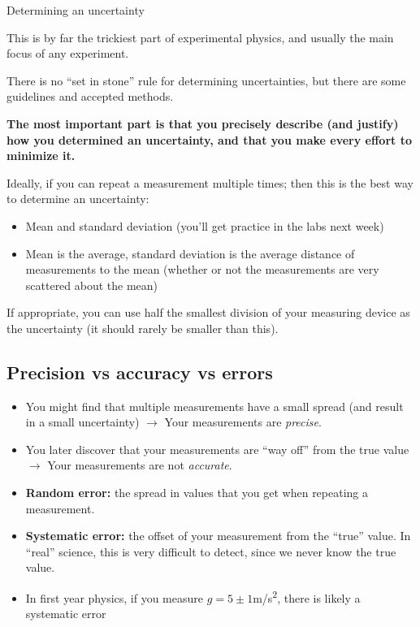 \documentclass[aspectratio=169,
hyperref={colorlinks,urlcolor=blue}
]{beamer}
\begin{document}
\begin{bulletframe}{Determining an uncertainty}
\item This is by far the trickiest part of experimental physics, and usually the main focus of any experiment.
\item There is no “set in stone” rule for determining uncertainties, but there are some guidelines and accepted methods.
\item \textbf{The most important part is that you precisely describe (and justify) how you determined an uncertainty, and that you make every effort to minimize it.}
\item Ideally, if you can repeat a measurement multiple times; then this is the best way to determine an uncertainty:
\begin{itemize}
\item Mean and standard deviation (you’ll get practice in the labs next week)
\item Mean is the average, standard deviation is the average distance of measurements to the mean (whether or not the measurements are very scattered about the mean)
\end{itemize}
\item If appropriate, you can use half the smallest division of your measuring device as the uncertainty (it should rarely be smaller than this).
\end{bulletframe}

\subsection{Precision vs accuracy  vs errors}
\label{subsec:}
{
\begin{itemize}
\item You might find that multiple measurements have a small spread (and result in a small uncertainty) $\rightarrow$ Your measurements are \emph{precise}.
\item You later discover that your measurements are “way off” from the true value $\rightarrow$ Your measurements are not \emph{accurate}.
\item \textbf{Random error:} the spread in values that you get when repeating a measurement.
\item \textbf{Systematic error:} the offset of your measurement from the “true” value. In “real” science, this is very difficult to detect, since we never know the true value.
\item In first year physics, if you measure $g=5\pm 1$\si{m/s^2}, there is likely a systematic error
\end{itemize}
}
{
}
\end{document}

